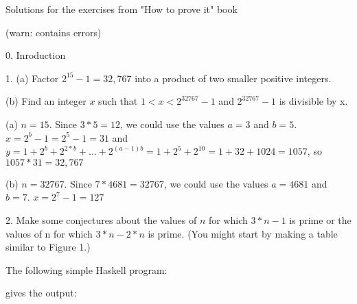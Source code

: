 \documentclass{article}
\begin{document}
\vspace*{\fill}
\centerline{\sc \large Solutions for the exercises from "How to prove it" book }
\centerline{\sc \large (warn: contains errors) }
\vspace*{\fill}
%
\pagebreak
\centerline{\sc \large 0. Inroduction}
\vspace{50pt}

1. (a) Factor $2^{15} - 1 = 32,767$ into a product of two smaller positive integers.

\hspace{12pt}(b) Find an integer $x$ such that $1 < x < 2^{32767} − 1$ and $2^{32767} - 1$ is divisible by x.
\vspace{20pt}


(a) $n = 15$. Since $3 * 5 = 12$, we could use the values $a = 3$ and $b = 5$.
$x = 2^b - 1 = 2^5 - 1 = 31$ and $y = 1 + 2^b + 2^{2*b} + \dotso + 2^{(a-1)b} = 1 + 2^5 + 2^{10} = 1 + 32 + 1024 = 1057$,
so $1057 * 31 = 32,767$
\vspace{10pt}

(b) $n=32767$. Since $7 * 4681 = 32767$, we could use the values $a = 4681$ and $b = 7$.
$x = 2^7 - 1 = 127$
\vspace{40pt}

2. Make some conjectures about the values of $n$ for which $3*n - 1$ is prime or
the values of n for which $3*n - 2*n$ is prime. (You might start by making a
table similar to Figure 1.)
\vspace{20pt}

The following simple Haskell program:

gives the output:
\end{document}
